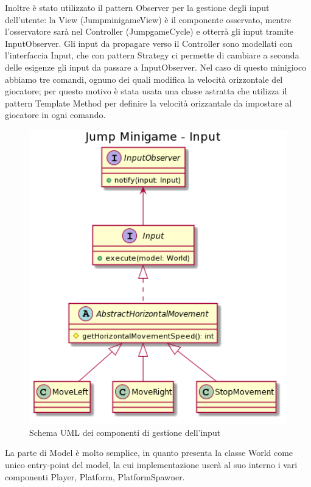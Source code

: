 \documentclass[a4paper,12pt]{report}
\begin{document}
	Inoltre è stato utilizzato il pattern Observer per la gestione degli input dell'utente: la View (JumpminigameView) è il componente osservato, mentre l'osservatore sarà nel Controller (JumpgameCycle) e otterrà gli input tramite InputObserver.\newline
	Gli input da propagare verso il Controller sono modellati con l'interfaccia Input, che con pattern Strategy ci permette di cambiare a seconda delle esigenze gli input da passare a InputObserver.
	Nel caso di questo minigioco abbiamo tre comandi, ognuno dei quali modifica la velocità orizzontale del giocatore;
    per questo motivo è stata usata una classe astratta che utilizza il pattern Template Method per definire la velocità orizzantale da impostare al giocatore in ogni comando.
    \begin{figure}[!t]
        \centering{}
        \includegraphics[width=150mm]{images/picchiotti/jumpinput.png}
        \caption{Schema UML dei componenti di gestione dell'input}
        \label{img:jumpinput}
    \end{figure}
	La parte di Model è molto semplice, in quanto presenta la classe World come unico entry-point del model, la cui implementazione userà al suo interno i vari componenti Player, Platform, PlatformSpawner.\newline
\end{document}
